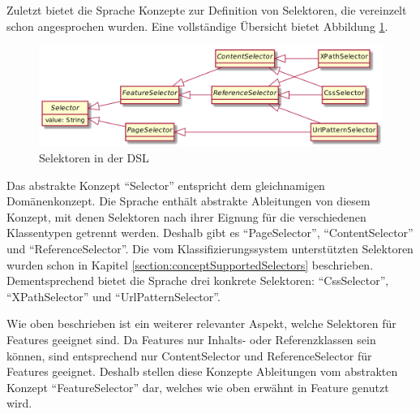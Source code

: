     Zuletzt bietet die Sprache Konzepte zur Definition von Selektoren,
    die vereinzelt schon angesprochen wurden.
    Eine vollständige Übersicht bietet Abbildung \ref{image:dslSelectors}.

    \begin{figure}[htb]
        \centering
        \includegraphics[width=\textwidth]{../resources/dsl/selectors.png}
        \caption{Selektoren in der DSL}
        \label{image:dslSelectors}
    \end{figure}

    Das abstrakte Konzept "`Selector"' entspricht dem gleichnamigen Domänenkonzept.
    Die Sprache enthält abstrakte Ableitungen von diesem Konzept,
    mit denen Selektoren nach ihrer Eignung für die verschiedenen Klassentypen
    getrennt werden. Deshalb gibt es "`PageSelector"', "`ContentSelector"' und "`ReferenceSelector"'.
    Die vom Klassifizierungssystem unterstützten Selektoren wurden schon in Kapitel
    \ref{section:conceptSupportedSelectors} beschrieben.
    Dementsprechend bietet die Sprache drei konkrete Selektoren:
    "`CssSelector"', "`XPathSelector"' und "`UrlPatternSelector"'.

    Wie oben beschrieben ist ein weiterer relevanter Aspekt, welche Selektoren
    für Features geeignet sind.
    Da Features nur Inhalts- oder Referenzklassen sein können,
    sind entsprechend nur ContentSelector und ReferenceSelector für Features geeignet.
    Deshalb stellen diese Konzepte Ableitungen vom abstrakten Konzept "`FeatureSelector"' dar,
    welches wie oben erwähnt in Feature genutzt wird.